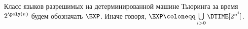 Класс языков разрешимых на детерминированной машине Тьюринга за время $2^{\poly(n)}$ будем обозначать
$\EXP$. Иначе говоря, $\EXP \coloneqq \bigcup\limits_{i > 0} \DTIME[2^{n^{i}}]$.